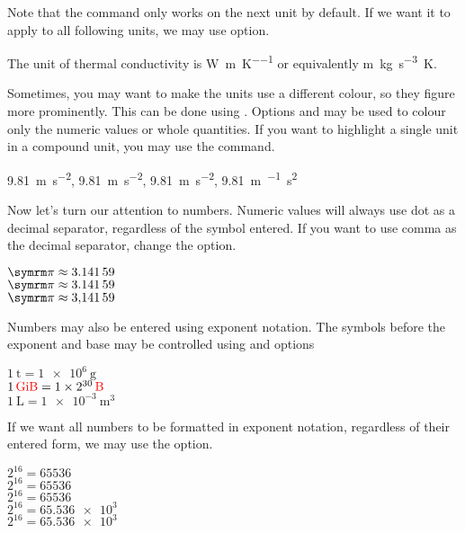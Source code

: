 Note that the  command only works on the next unit by default. If we
want it to apply to all following units, we may use  option.
\begin{example}[examplewidth=0.7\linewidth, vertical_mode]
The unit of thermal conductivity is
\unit{\watt\per\metre\per\kelvin}
or equivalently
\unit[sticky-per]{\m\kg\per\s\cubed\K}.
\end{example}

Sometimes, you may want to make the units use a different colour, so they figure
more prominently. This can be done using . Options
 and  may be used to colour only the numeric
values or whole quantities. If you want to highlight a single unit in a
compound unit, you may use the  command.
\begin{example}[examplewidth=0.8\linewidth, vertical_mode]
\qty[unit-color = red   ]{9.81}{\m\per\s\squared},
\qty[number-color = blue]{9.81}{\m\per\s\squared},
\qty[color = green      ]{9.81}{\m\per\s\squared},
\qty{9.81}{\m\per{}\s\squared}
\end{example}

Now let's turn our attention to numbers. Numeric values will always use dot
as a decimal separator, regardless of the symbol entered. If you want to use
comma as the decimal separator, change the  option.
\begin{example}
\NewDocumentCommand{\cpi}{}{\symrm{\pi}} %
\(\cpi \approx \num{3.14159}\)
\\ %
\(\cpi \approx \num{3,14159}\)
\\ %
\(\cpi \approx \num[
  output-decimal-marker={,}
]{3.14159}\)
\end{example}

Numbers may also be entered using exponent notation. The symbols before the
exponent and base may be controlled using  and
 options
\begin{example}
\(\qty{1}{\tonne}
  = \qty{1e6}{\g}\) \\
\(\qty{1}{\gibi\byte} = \qty[
  exponent-base = 2,
]{1e30}{\byte}\) \\
\(\qty{1}{\L} = \qty[
  exponent-product = \cdot,
]{1e-3}{\cubic\m}\)
\end{example}

If we want all numbers to be formatted in exponent notation, regardless of
their entered form, we may use the  option.
\begin{example}
\(2^{16} = \num{65536}\) \\
\(2^{16} = \num[
  exponent-mode = scientific,
]{65536}\) \\
\(2^{16} = \num[
  exponent-mode = engineering,
]{65536}\) \\
\(2^{16} = \num[
  exponent-mode = fixed,
]{65.536e3}\) \\
\(2^{16} = \num[
  exponent-mode = fixed,
  fixed-exponent = 5,
]{65.536e3}\)
\end{example}

